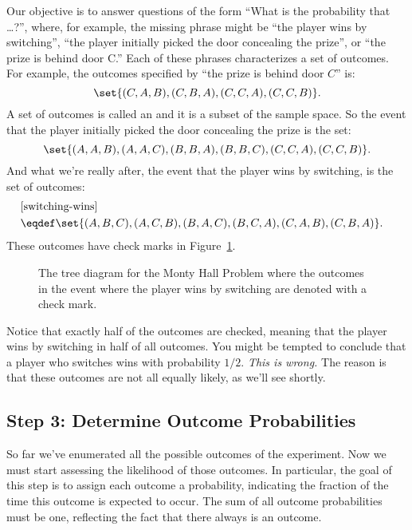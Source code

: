 Our objective is to answer questions of the form ``What is the
probability that \dots ?'', where, for example, the missing phrase
might be ``the player wins by switching'', ``the player initially
picked the door concealing the prize'', or ``the prize is behind door
C.''  Each of these phrases characterizes a set of outcomes. For
example, the outcomes specified by ``the prize is behind door $C$''
is:
%
\[
    \set{(C, A, B), (C, B, A), (C, C, A), (C, C, B)}.
\]
%
A set of outcomes is called an  and it is a subset of the
sample space.  So the event that the player initially picked the door
concealing the prize is the set:
%
\[
    \set{(A, A, B), (A, A, C), (B, B, A), (B, B, C), (C, C, A), (C, C, B)}.
\]
%
And what we're really after, the event that the player wins by
switching, is the set of outcomes:
\begin{align}
\lefteqn{[\text{switching-wins}]}\notag\\
   & \eqdef \set{(A, B, C), (A, C, B), (B, A, C),
  (B, C, A), (C, A, B), (C, B, A)}.\label{swwin-event}
\end{align}
These outcomes have check marks in Figure~\ref{fig:14A4}.
\begin{figure}


\caption{The tree diagram for the Monty Hall Problem where the
  outcomes in the event where the player wins by switching are denoted
  with a check mark.}

\label{fig:14A4}

\end{figure}

Notice that exactly half of the outcomes are checked, meaning that the
player wins by switching in half of all outcomes.  You might be
tempted to conclude that a player who switches wins with probability
$1/2$.  \emph{This is wrong.}  The reason is that these outcomes are
not all equally likely, as we'll see shortly.

\subsection{Step 3: Determine Outcome Probabilities}

So far we've enumerated all the possible outcomes of the experiment.  Now
we must start assessing the likelihood of those outcomes.  In particular,
the goal of this step is to assign each outcome a probability, indicating
the fraction of the time this outcome is expected to occur.  The sum of
all outcome probabilities must be one, reflecting the fact that there
always is an outcome.


